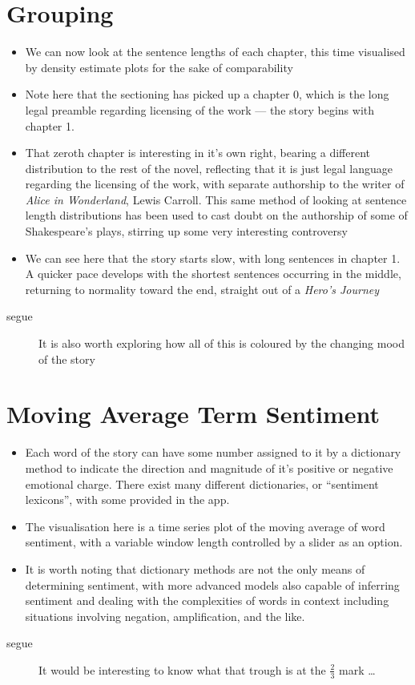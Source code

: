 \documentclass[11pt,a4paper]{article}
\begin{document}
\section{Grouping}
\label{sec:grouping}
\begin{itemize}
\item We can now look at the sentence lengths of each chapter, this
  time visualised by density estimate plots for the sake of
  comparability
\item Note here that the sectioning has picked up a chapter 0, which
  is the long legal preamble regarding licensing of the work --- the
  story begins with chapter 1.
\item That zeroth chapter is interesting in it's own right, bearing a
  different distribution to the rest of the novel, reflecting that it
  is just legal language regarding the licensing of the work, with
  separate authorship to the writer of \textit{Alice in Wonderland},
  Lewis Carroll. This same method of looking at sentence length
  distributions has been used to cast doubt on the authorship of some
  of Shakespeare's plays, stirring up some very interesting
  controversy
\item We can see here that the story starts slow, with long sentences
  in chapter 1. A quicker pace develops with the shortest sentences
  occurring in the middle, returning to normality toward the end,
  straight out of a \textit{Hero's Journey}
\end{itemize}
\begin{description}
\item[segue] It is also worth exploring how all of this is coloured by the
  changing mood of the story
\end{description}

\section{Moving Average Term Sentiment}
\label{sec:sentiment}
\begin{itemize}
\item Each word of the story can have some number assigned to it by a
  dictionary method to indicate the direction and magnitude of it's
  positive or negative emotional charge. There exist many different
  dictionaries, or \enquote{sentiment lexicons}, with some provided in
  the app.
\item The visualisation here is a time series plot of the moving
  average of word sentiment, with a variable window length controlled
  by a slider as an option.
\item It is worth noting that dictionary methods are not the only
  means of determining sentiment, with more advanced models also
  capable of inferring sentiment and dealing with the complexities of
  words in context including situations involving negation,
  amplification, and the like.
\end{itemize}
\begin{description}
\item[segue] It would be interesting to know what that trough is at
  the \(\frac{2}{3}\) mark \dots{}
\end{description}
\end{document}
